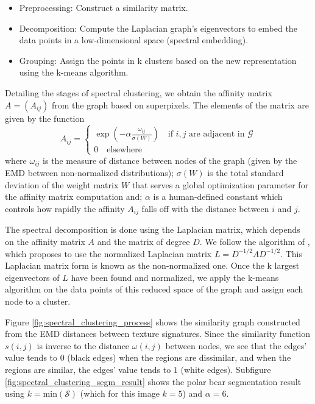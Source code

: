 \documentclass[journal]{IEEEtran}
\begin{document}
\begin{itemize}
	\item Preprocessing: Construct a similarity matrix.
	\item Decomposition: Compute the Laplacian graph's eigenvectors to embed the data points in a low-dimensional space (spectral embedding).
	\item Grouping: Assign the points in k clusters based on the new representation using the k-means algorithm.
\end{itemize}

Detailing the stages of spectral clustering, we obtain the affinity matrix $A = (A_{ij})$ from the graph based on superpixels. The elements of the matrix are given by the function
\begin{equation}	
	A_{ij}= 
	\begin{cases}
		\exp{\left(- \alpha \frac{\omega_{ij}}{\sigma(W)}\right)}  \quad \text{if $i, j$ are adjacent in $\mathcal{G}$} \\
		0 \quad \text{elsewhere}
	\end{cases}	 
\end{equation}
where $\omega_{ij}$ is the measure of distance between nodes of the graph (given by the EMD between non-normalized distributions); $\sigma(W)$ is the total standard deviation of the weight matrix $W$ that serves a global optimization parameter for the affinity matrix computation and; $\alpha$ is a human-defined constant which controls how rapidly the affinity $A_{ij}$ falls off with the distance between $i$ and $j$.

The spectral decomposition is done using the Laplacian matrix, which depends on the affinity matrix $A$ and the matrix of degree $D$. We follow the algorithm of \cite{Ng.Jordan.ea:NIPS:2001}, which proposes to use the normalized Laplacian matrix $L = D^{-1/2} A D^{-1/2}$. This Laplacian matrix form is known as the non-normalized one. Once the k largest eigenvectors of $ L $ have been found and normalized, we apply the k-means algorithm on the data points of this reduced space of the graph and assign each node to a cluster.

Figure \ref{fig:spectral_clustering_process} shows the similarity graph constructed from the EMD distances between texture signatures. Since the similarity function $s(i, j)$ is inverse to the distance $\omega (i, j)$ between nodes, we see that the edges' value tends to $0$ (black edges) when the regions are dissimilar, and when the regions are similar, the edges' value tends to $1$ (white edges). Subfigure \ref{fig:spectral_clustering_segm_result} shows the polar bear segmentation result using $k = \mathrm{min}(\mathcal{S})$ (which for this image $k =5$) and $\alpha = 6$.
\end{document}
